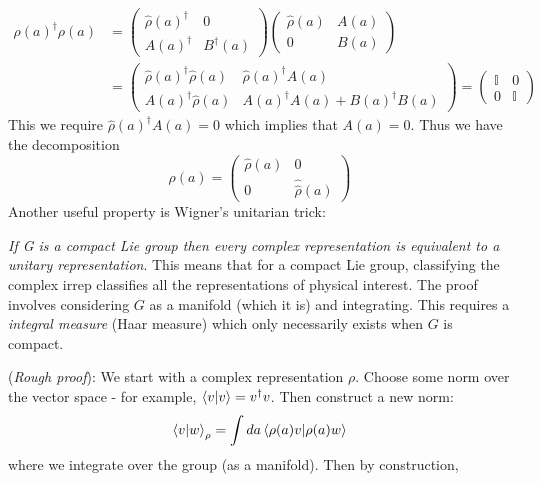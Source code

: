 \begin{enumerate}
\begin{equation}
    \begin{split}
        \rho(a)^{\dagger}\rho(a) &= \begin{pmatrix}
        \hat{\rho}(a)^{\dagger} & 0\\
        A(a)^{\dagger} &B^{\dagger}(a)
    \end{pmatrix} \begin{pmatrix}
        \hat{\rho}(a) & A(a)\\
        0 &B(a)
    \end{pmatrix}\\
    &=\begin{pmatrix}
        \hat{\rho}(a)^{\dagger}\hat{\rho}(a) & \hat{\rho}(a)^{\dagger}A(a)\\
        A(a)^{\dagger}\hat{\rho}(a) &A(a)^{\dagger}A(a) + B(a)^{\dagger}B(a)
    \end{pmatrix} = \begin{pmatrix}
        \mathbb{I} & 0\\
        0 &\mathbb{I}
    \end{pmatrix}
    \end{split}
\end{equation}
This we require $\hat{\rho}(a)^{\dagger}A(a)=0$ which implies that $A(a)=0$. Thus we have the decomposition 
\begin{equation}
    \rho(a) = \begin{pmatrix}
        \hat{\rho}(a) & 0\\
        0 & \hat{\hat{\rho}}(a)
    \end{pmatrix}
\end{equation}
Another useful property is Wigner's unitarian trick: 

\textit{If G is a compact Lie group then every complex representation is equivalent to a unitary representation}. This means that for a compact Lie group, classifying the complex irrep classifies all the representations of physical interest. The proof involves considering $G$ as a manifold (which it is) and integrating. This requires a \textit{integral measure} (Haar measure) which only necessarily exists when $G$ is compact. 

(\textit{Rough proof}): We start with a complex representation $\rho$. Choose some norm over the vector space  - for example, $\braket{v|v} = v^{\dagger}v$. Then construct a new norm: 
\begin{equation}
    \braket{v|w}_{\rho} = \int da\braket{\rho(a)v|\rho(a)w}
\end{equation}
where we integrate over the group (as a manifold). Then by construction, 


\end{enumerate}
